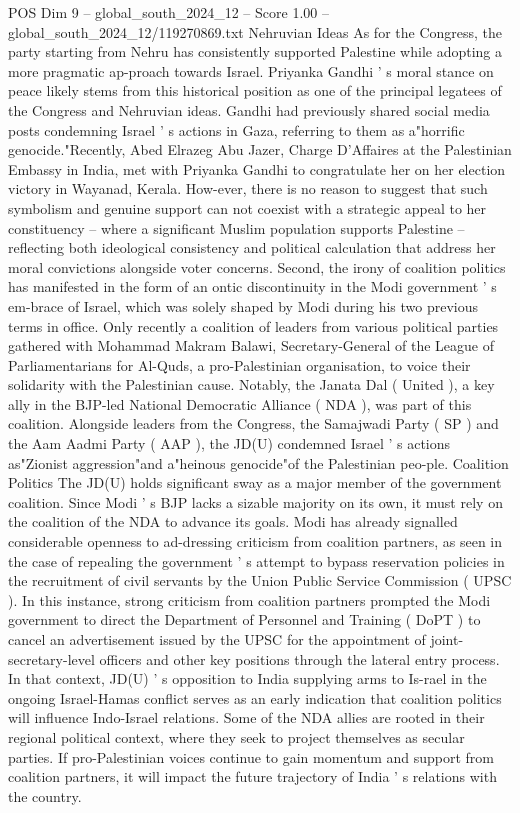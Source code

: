 \begin{textsample}{POS Dim 9 – global\_south\_2024\_12 – Score 1.00 – global\_south\_2024\_12/119270869.txt}
Nehruvian Ideas As for the Congress, the party starting from Nehru has consistently supported Palestine while adopting a more pragmatic ap-proach towards Israel.
Priyanka Gandhi ' s moral stance on peace likely stems from this historical position as one of the principal legatees of the Congress and Nehruvian ideas.
Gandhi had previously shared social media posts condemning Israel ' s actions in Gaza, referring to them as a"horrific genocide."Recently, Abed Elrazeg Abu Jazer, Charge D'Affaires at the Palestinian Embassy in India, met with Priyanka Gandhi to congratulate her on her election victory in Wayanad, Kerala.
How-ever, there is no reason to suggest that such symbolism and genuine support can not coexist with a strategic appeal to her constituency -- where a significant Muslim population supports Palestine -- reflecting both ideological consistency and political calculation that address her moral convictions alongside voter concerns.
Second, the irony of coalition politics has manifested in the form of an ontic discontinuity in the Modi government ' s em-brace of Israel, which was solely shaped by Modi during his two previous terms in office.
Only recently a coalition of leaders from various political parties gathered with Mohammad Makram Balawi, Secretary-General of the League of Parliamentarians for Al-Quds, a pro-Palestinian organisation, to voice their solidarity with the Palestinian cause.
Notably, the Janata Dal ( United ), a key ally in the BJP-led National Democratic Alliance ( NDA ), was part of this coalition.
Alongside leaders from the Congress, the Samajwadi Party ( SP ) and the Aam Aadmi Party ( AAP ), the JD(U) condemned Israel ' s actions as"Zionist aggression"and a"heinous genocide"of the Palestinian peo-ple.
Coalition Politics The JD(U) holds significant sway as a major member of the government coalition.
Since Modi ' s BJP lacks a sizable majority on its own, it must rely on the coalition of the NDA to advance its goals.
Modi has already signalled considerable openness to ad-dressing criticism from coalition partners, as seen in the case of repealing the government ' s attempt to bypass reservation policies in the recruitment of civil servants by the Union Public Service Commission ( UPSC ).
In this instance, strong criticism from coalition partners prompted the Modi government to direct the Department of Personnel and Training ( DoPT ) to cancel an advertisement issued by the UPSC for the appointment of joint-secretary-level officers and other key positions through the lateral entry process.
In that context, JD(U) ' s opposition to India supplying arms to Is-rael in the ongoing Israel-Hamas conflict serves as an early indication that coalition politics will influence Indo-Israel relations.
Some of the NDA allies are rooted in their regional political context, where they seek to project themselves as secular parties.
If pro-Palestinian voices continue to gain momentum and support from coalition partners, it will impact the future trajectory of India ' s relations with the country.

\end{textsample}
